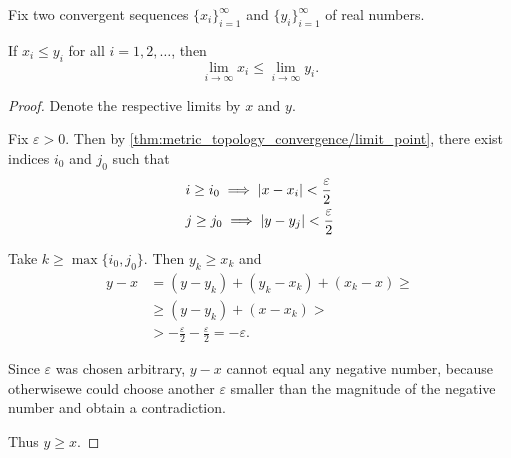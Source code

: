 \begin{proposition}\label{thm:one_sided_squeeze_lemma}
  Fix two convergent sequences \( \{ x_i \}_{i=1}^\infty \) and \( \{ y_i \}_{i=1}^\infty \) of real numbers.

  If \( x_i \leq y_i \) for all \( i = 1, 2, \ldots \), then
  \begin{equation*}
    \lim_{i \to \infty} x_i \leq \lim_{i \to \infty} y_i.
  \end{equation*}
\end{proposition}
\begin{proof}
  Denote the respective limits by \( x \) and \( y \).

  Fix \( \varepsilon > 0 \). Then by \cref{thm:metric_topology_convergence/limit_point}, there exist indices \( i_0 \) and \( j_0 \) such that
  \begin{align*}
    &i \geq i_0 \implies \left\vert x - x_i \right\vert < \frac \varepsilon 2 \\
    &j \geq j_0 \implies \left\vert y - y_j \right\vert < \frac \varepsilon 2
  \end{align*}

  Take \( k \geq \max \{ i_0, j_0 \} \). Then \( y_k \geq x_k \) and
  \begin{align*}
    y - x
    &=
    (y - y_k) + (y_k - x_k) + (x_k - x)
    \geq \\ &\geq
    (y - y_k) + (x - x_k)
    > \\ &>
    - \frac \varepsilon 2 - \frac \varepsilon 2
    =
    - \varepsilon.
  \end{align*}

  Since \( \varepsilon \) was chosen arbitrary, \( y - x \) cannot equal any negative number, because otherwise\LEM we could choose another \( \varepsilon \) smaller than the magnitude of the negative number and obtain a contradiction.

  Thus \( y \geq x \).
\end{proof}

